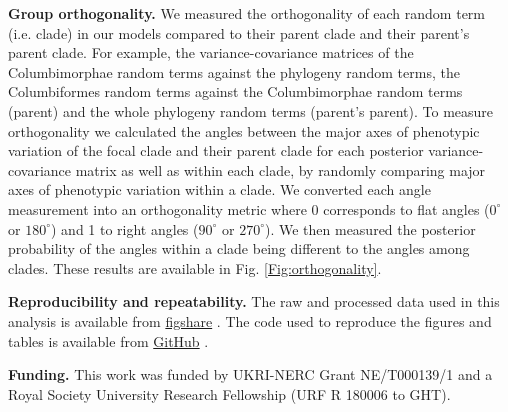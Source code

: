\documentclass[12pt,letterpaper]{article}
\begin{document}
\textbf{Group orthogonality.}
We measured the orthogonality of each random term (i.e. clade) in our models compared to their parent clade and their parent's parent clade.
For example, the variance-covariance matrices of the Columbimorphae random terms against the phylogeny random terms, the Columbiformes random terms against the Columbimorphae random terms (parent) and the whole phylogeny random terms (parent's parent).
To measure orthogonality we calculated the angles between the major axes of phenotypic variation of the focal clade and their parent clade for each posterior variance-covariance matrix as well as within each clade, by randomly comparing major axes of phenotypic variation within a clade.
We converted each angle measurement into an orthogonality metric where 0 corresponds to flat angles ($0^\circ$ or  $180^\circ$) and 1 to right angles ($90^\circ$ or $270^\circ$).
We then measured the posterior probability of the angles within a clade being different to the angles among clades.
These results are available in Fig. \ref{Fig:orthogonality}.

\textbf{Reproducibility and repeatability.}
The raw and processed data used in this analysis is available from \href{https://figshare.com/articles/dataset/Innovation_and_elaboration_on_the_avian_tree_of_life/20480355}{figshare} \cite{fighsaredata}.
The code used to reproduce the figures and tables is available from \href{https://github.com/TGuillerme/elaboration_exploration_bird_beaks}{GitHub} \cite{githubrepo}.

\textbf{Funding.}
This work was funded by UKRI-NERC Grant NE/T000139/1 and a Royal Society University Research Fellowship (URF R 180006 to GHT).




\end{document}

